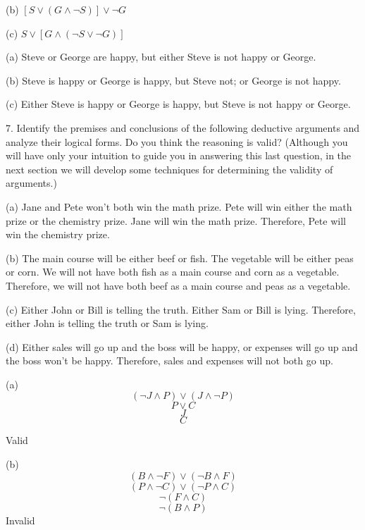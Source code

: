 \documentclass{article}
\begin{document}
\hspace{12pt}(b) $[S \lor (G \land \neg S)] \lor \neg G$

\hspace{12pt}(c) $S \lor [G \land (\neg S \lor \neg G)]$
\vspace{20pt}

(a) Steve or George are happy, but either Steve is not happy or George.

(b) Steve is happy or George is happy, but Steve not; or George is not happy.

(c) Either Steve is happy or George is happy, but Steve is not happy or George.
\vspace{40pt}

7. Identify the premises and conclusions of the following deductive arguments
and analyze their logical forms. Do you think the reasoning is valid?
(Although you will have only your intuition to guide you in answering
this last question, in the next section we will develop some techniques for
determining the validity of arguments.)

\hspace{12pt}(a) Jane and Pete won’t both win the math prize. Pete will win either
the math prize or the chemistry prize. Jane will win the math prize.
Therefore, Pete will win the chemistry prize.

\hspace{12pt}(b) The main course will be either beef or fish. The vegetable will be either
peas or corn. We will not have both fish as a main course and corn as a
vegetable. Therefore, we will not have both beef as a main course and
peas as a vegetable.

\hspace{12pt}(c) Either John or Bill is telling the truth. Either Sam or Bill is lying.
Therefore, either John is telling the truth or Sam is lying.

\hspace{12pt}(d) Either sales will go up and the boss will be happy, or expenses will go up and the boss won’t be happy. Therefore, sales and expenses will not
both go up.
\vspace{20pt}

(a) $$(\neg J \land P) \lor (J \land \neg P)$$
$$P \lor C$$
$$J$$
$$C$$

Valid

\vspace{20pt}

(b) $$(B \land \neg F) \lor (\neg B \land F)$$
$$(P \land \neg C) \lor (\neg P \land C)$$
$$\neg (F \land C)$$
$$\neg (B \land P)$$
Invalid
\end{document}
